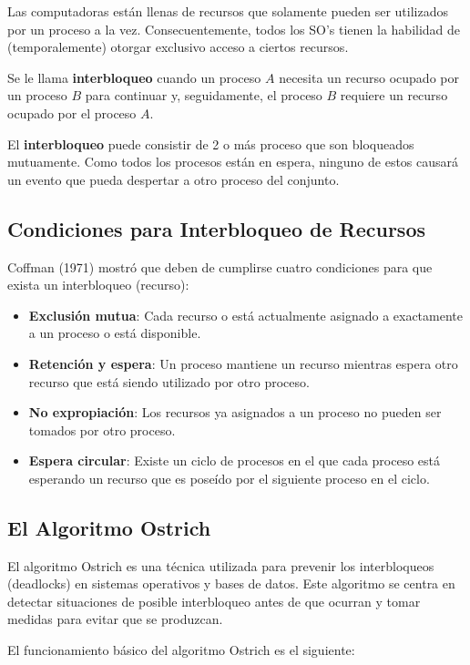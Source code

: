 \documentclass[12pt, a4paper]{article} %
\begin{document}
Las computadoras están llenas de recursos que solamente pueden ser utilizados por un proceso a la vez. Consecuentemente, todos los SO's tienen la habilidad de (temporalemente) otorgar exclusivo acceso a ciertos recursos.

Se le llama \textbf{interbloqueo} cuando un proceso $A$ necesita un recurso ocupado por un proceso $B$ para continuar y, seguidamente, el proceso $B$ requiere un recurso ocupado por el proceso $A$. 

El \textbf{interbloqueo} puede consistir de 2 o más proceso que son bloqueados mutuamente. Como todos los procesos están en espera, ninguno de estos causará un evento que pueda despertar a otro proceso del conjunto.

\subsection{Condiciones para Interbloqueo de Recursos}

Coffman (1971) mostró que deben de cumplirse cuatro condiciones para que exista un interbloqueo (recurso):

\begin{itemize}
	\item \textbf{Exclusión mutua}:  Cada recurso o está actualmente asignado a exactamente a un proceso o está disponible.
	\item \textbf{Retención y espera}: Un proceso mantiene un recurso mientras espera otro recurso que está siendo utilizado por otro proceso.
	\item \textbf{No expropiación}: Los recursos ya asignados a un proceso no pueden ser tomados por otro proceso.
	\item \textbf{Espera circular}: Existe un ciclo de procesos en el que cada proceso está esperando un recurso que es poseído por el siguiente proceso en el ciclo.
\end{itemize}

\subsection{El Algoritmo Ostrich}

El algoritmo Ostrich es una técnica utilizada para prevenir los interbloqueos (deadlocks) en sistemas operativos y bases de datos. Este algoritmo se centra en detectar situaciones de posible interbloqueo antes de que ocurran y tomar medidas para evitar que se produzcan.

El funcionamiento básico del algoritmo Ostrich es el siguiente:
\end{document}
